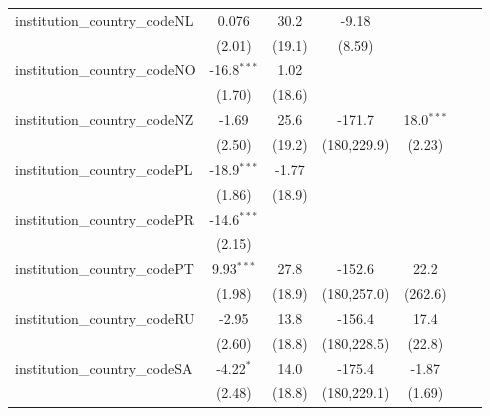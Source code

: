 \begin{tabular}{lcccccc}
   institution\_country\_codeNL          & 0.076         & 30.2         & -9.18         &               &               &   \\   
                                         & (2.01)        & (19.1)       & (8.59)        &               &               &   \\   
   institution\_country\_codeNO          & -16.8$^{***}$ & 1.02         &               &               &               &   \\   
                                         & (1.70)        & (18.6)       &               &               &               &   \\   
   institution\_country\_codeNZ          & -1.69         & 25.6         & -171.7        & 18.0$^{***}$  &               &   \\   
                                         & (2.50)        & (19.2)       & (180,229.9)   & (2.23)        &               &   \\   
   institution\_country\_codePL          & -18.9$^{***}$ & -1.77        &               &               &               &   \\   
                                         & (1.86)        & (18.9)       &               &               &               &   \\   
   institution\_country\_codePR          & -14.6$^{***}$ &              &               &               &               &   \\   
                                         & (2.15)        &              &               &               &               &   \\   
   institution\_country\_codePT          & 9.93$^{***}$  & 27.8         & -152.6        & 22.2          &               &   \\   
                                         & (1.98)        & (18.9)       & (180,257.0)   & (262.6)       &               &   \\   
   institution\_country\_codeRU          & -2.95         & 13.8         & -156.4        & 17.4          &               &   \\   
                                         & (2.60)        & (18.8)       & (180,228.5)   & (22.8)        &               &   \\   
   institution\_country\_codeSA          & -4.22$^{*}$   & 14.0         & -175.4        & -1.87         &               &   \\   
                                         & (2.48)        & (18.8)       & (180,229.1)   & (1.69)        &               &   \\   

\end{tabular}
